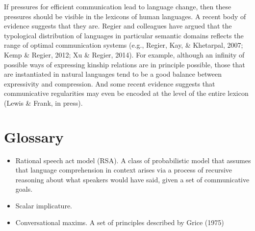 \documentclass[]{elsarticle}
\begin{document}
If pressures for efficient communication lead to language change, then
these pressures should be visible in the lexicons of human languages. A
recent body of evidence suggests that they are. Regier and colleagues
have argued that the typological distribution of languages in particular
semantic domains reflects the range of optimal communication systems
(e.g., Regier, Kay, \& Khetarpal, 2007; Kemp \& Regier, 2012; Xu \&
Regier, 2014). For example, although an infinity of possible ways of
expressing kinship relations are in principle possible, those that are
instantiated in natural languages tend to be a good balance between
expressivity and compression. And some recent evidence suggests that
communicative regularities may even be encoded at the level of the
entire lexicon (Lewis \& Frank, in press).

\section{Glossary}\label{glossary}

\begin{itemize}
\item

  Rational speech act model (RSA). A class of probabilistic model that
  assumes that language comprehension in context arises via a process of
  recursive reasoning about what speakers would have said, given a set
  of communicative goals.

\item

  Scalar implicature.

\item

  Conversational maxims. A set of principles described by Grice (1975)

\end{itemize}
\end{document}
